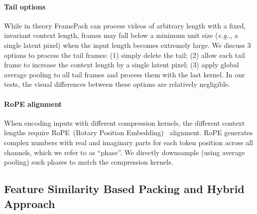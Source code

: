 \documentclass{article}
\makeatletter
\DeclareRobustCommand\onedot{\futurelet\@let@token\@onedot}
\def\@onedot{\ifx\@let@token.\else.\null\fi\xspace}
\def\eg{\emph{e.g}\onedot}
\makeatother
\begin{document}
\paragraph{Tail options}

\label{sec:tail}

While in theory FramePack can process videos of arbitrary length with a fixed, invariant context length, frames may fall below a minimum unit size (\eg, a single latent pixel) when the input length becomes extremely large. We discuss 3 options to process the tail frames: (1) simply delete the tail; (2) allow each tail frame to increase the context length by a single latent pixel; (3) apply global average pooling to all tail frames and process them with the last kernel. In our tests, the visual differences between these options are relatively negligible.

\paragraph{RoPE alignment}

When encoding inputs with different compression kernels, the different context lengths require RoPE~(Rotary Position Embedding)~\cite{su2024roformer} alignment. RoPE generates complex numbers with real and imaginary parts for each token position across all channels, which we refer to as ``phase''. We directly downsample (using average pooling) such phases to match the compression kernels.

\subsection{Feature Similarity Based Packing and Hybrid Approach}

\label{sec:feature_pack}
\end{document}
